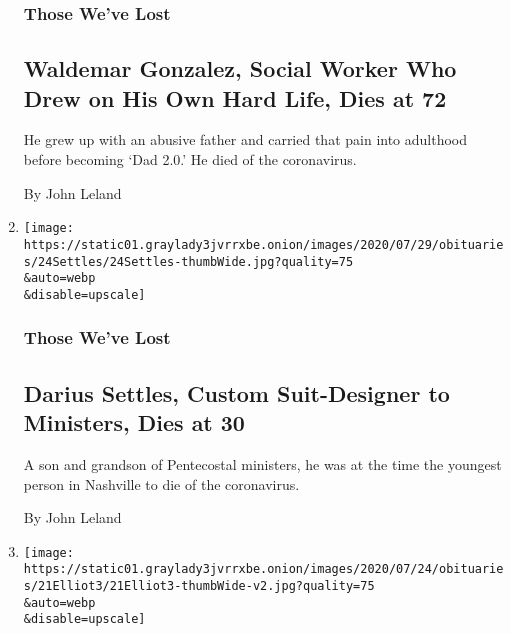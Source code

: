 \begin{enumerate}
  \hypertarget{those-weve-lost-1}{%
  \subsubsection{Those We've Lost}\label{those-weve-lost-1}}

  \hypertarget{waldemar-gonzalez-social-worker-who-drew-on-his-own-hard-life-dies-at-72}{%
  \subsection{Waldemar Gonzalez, Social Worker Who Drew on His Own Hard
  Life, Dies at
  72}\label{waldemar-gonzalez-social-worker-who-drew-on-his-own-hard-life-dies-at-72}}

  He grew up with an abusive father and carried that pain into adulthood
  before becoming `Dad 2.0.' He died of the coronavirus.

  By John Leland
\item
  \href{/2020/07/27/obituaries/darius-settles-dead-coronavirus.html}{}

  \texttt{[image: https://static01.graylady3jvrrxbe.onion/images/2020/07/29/obituaries/24Settles/24Settles-thumbWide.jpg?quality=75\\\&auto=webp\\\&disable=upscale]}

  \hypertarget{those-weve-lost-2}{%
  \subsubsection{Those We've Lost}\label{those-weve-lost-2}}

  \hypertarget{darius-settles-custom-suit-designer-to-ministers-dies-at-30}{%
  \subsection{Darius Settles, Custom Suit-Designer to Ministers, Dies at
  30}\label{darius-settles-custom-suit-designer-to-ministers-dies-at-30}}

  A son and grandson of Pentecostal ministers, he was at the time the
  youngest person in Nashville to die of the coronavirus.

  By John Leland
\item
  \href{/2020/07/22/arts/tony-elliott-time-out-founder-dead.html}{}

  \texttt{[image: https://static01.graylady3jvrrxbe.onion/images/2020/07/24/obituaries/21Elliot3/21Elliot3-thumbWide-v2.jpg?quality=75\\\&auto=webp\\\&disable=upscale]}

  \hypertarget{tony-elliott-whose-time-out-clued-readers-in-dies-at-73}{%
}
\end{enumerate}
